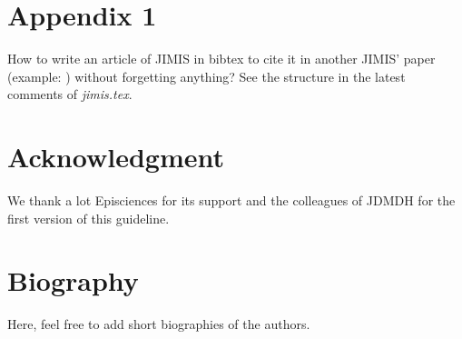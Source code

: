 \documentclass{jimis-final-en}
\begin{document}



\appendix\footnotesize

\section{Appendix 1}
How to write an article of JIMIS in bibtex to cite it in another JIMIS' paper (example: \citet{jimis}) without forgetting anything? See the structure in the latest comments of \textit{jimis.tex}.

\section{Acknowledgment}
We thank a lot Episciences for its support and the colleagues of JDMDH for the first version of this guideline.

\section{Biography}
Here, feel free to add short biographies of the authors.

 
\end{document}

